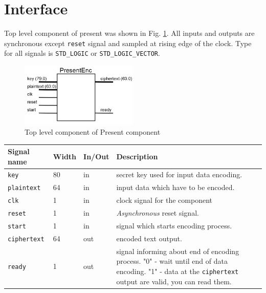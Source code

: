 \documentclass{gajewski}
\begin{document}
\newpage 

\section{Interface}

Top level component of present was shown in Fig. \ref{penc}. All inputs and outputs are synchronous except \texttt{reset} signal and sampled at rising edge of the clock. Type for all signals is \texttt{STD\_LOGIC} or \texttt{STD\_LOGIC\_VECTOR}.
\begin{figure}[!ht]%
    \begin{center}
    \includegraphics[width=0.5\textwidth]{img/PresentEnc.png}
    \caption{%
        Top level component of Present component
     }%
    \label{penc}
    \end{center}
 \end{figure}

\begin{tabularx}{\textwidth}{|p{30mm}|p{11mm}|p{11mm}|X|}
  \hline \bf{Signal name} & \bf{Width} & \bf{In/Out} & \bf{Description}\\ 
  \hline \texttt{key}	& 80  &  in  & secret key used for input data encoding. \\ 
  \hline \texttt{plaintext}	& 64  &  in  & input data which have to be encoded. \\ 
  \hline \texttt{clk}	& 1  &  in  &  clock signal for the component\\ 
  \hline \texttt{reset} & 1   &  in  & \emph{Asynchronous} reset signal.	\\ 
  \hline \texttt{start} & 1   &  in  & signal which starts encoding process. \\ 
  \hline \texttt{ciphertext} & 64   &  out  & encoded text output. \\ 
  \hline \texttt{ready} & 1   &  out  & signal informing about end of encoding process. \newline  "0" - wait until end of data encoding. \newline  "1" - data at the \texttt{ciphertext} output are valid, you can read them. \\ 
  \hline
\end{tabularx}
\end{document}
